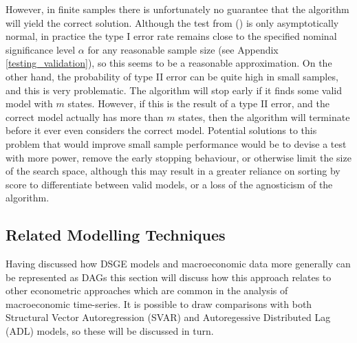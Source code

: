 \documentclass{article}
\begin{document}
However, in finite samples there is unfortunately no guarantee that the algorithm will yield the correct solution. Although the test from \citeauthor{srivastava2005some} (\citeyear{srivastava2005some}) is only asymptotically normal, in practice the type I error rate remains close to the specified nominal significance level $\alpha$ for any reasonable sample size (see Appendix \ref{testing_validation}), so this seems to be a reasonable approximation. On the other hand, the probability of type II error can be quite high in small samples, and this is very problematic. The algorithm will stop early if it finds some valid model with $m$ states. However, if this is the result of a type II error, and the correct model actually has more than $m$ states, then the algorithm will terminate before it ever even considers the correct model. Potential solutions to this problem that would improve small sample performance would be to devise a test with more power, remove the early stopping behaviour, or otherwise limit the size of the search space, although this may result in a greater reliance on sorting by score to differentiate between valid models, or a loss of the agnosticism of the algorithm.

\subsection{Related Modelling Techniques}

Having discussed how DSGE models and macroeconomic data more generally can be represented as DAGs this section will discuss how this approach relates to other econometric approaches which are common in the analysis of macroeconomic time-series. It is possible to draw comparisons with both Structural Vector Autoregression (SVAR) and Autoregessive Distributed Lag (ADL) models, so these will be discussed in turn.
\end{document}

